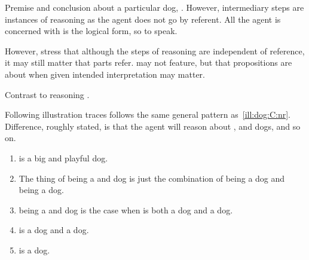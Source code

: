 \begin{note}[Summarise]
  Premise and conclusion about a particular dog, .
  However, intermediary steps are instances of reasoning \nr{} as the agent does not go by referent.
  All the agent is concerned with is the logical form, so to speak.

  However, stress that although the steps of reasoning are independent of reference, it may still matter that parts refer.
   may not feature, but that propositions are about  when given intended interpretation may matter.
\end{note}

\begin{note}
  Contrast to reasoning \ur{}.

  Following illustration traces follows the same general pattern as~\autoref{ill:dog:C:nr}.
  Difference, roughly stated, is that the agent will reason about , \RIPa{} and \RIPb{} dogs, and so on.
\end{note}

\begin{note}[Example, \ur{}]

  \begin{illustration}
    \vspace{-\baselineskip}
    \begin{enumerate}[label=\(\protect\iDog\)\space\arabic*., ref=\arabic*, align=left, leftmargin=*]
    \item\label{ill:iDog:mixed}  is a big and playful dog.
    \item\label{ill:iDog:sep-gen} The thing of being a \RIPa{} and \RIPb{} dog is just the combination of being a \RIPa{} dog and being a \RIPb{} dog.
    \item\label{ill:iDog:sep-app}  being a \RIPa{} and \RIPb{} dog is the case when  is both a \RIPa{} dog and a \RIPb{} dog.
    \item\label{ill:iDog:sep-con}  is a \RIPa{} dog and  a \RIPb{} dog.
    \item\label{ill:iDog:sep-res}  is a \RIPb{} dog.
    \end{enumerate}
    \vspace{-\baselineskip}
  \end{illustration}
\end{note}

